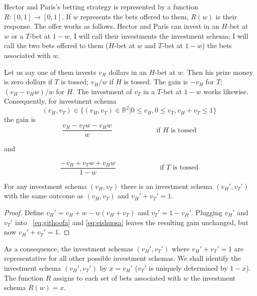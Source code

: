 \documentclass[12pt]{article}
\begin{document}
Hector and Paris's betting strategy is represented by a function
$R:[0,1]\rightarrow[0,1]$. If $w$ represents the bets offered to them,
$R(w)$ is their response. The offer works as follows. Hector and Paris
can invest in an $H$-bet at $w$ or a $T$-bet at $1-w$. I will call
their investments the investment schema; I will call the two bets offered
to them ($H$-bet at $w$ and $T$-bet at $1-w$) the bets associated with
$w$.

Let us say one of them invests $v_{H}$ dollars in an $H$-bet at $w$.
Then his prize money is zero dollars if $T$ is tossed; $v_{H}/w$ if $H$ is
tossed. The gain is $-v_{H}$ for $T$; $(v_{H}-v_{H}w)/w$ for $H$. The
investment of $v_{T}$ in a $T$-bet at $1-w$ works likewise.
Consequently, for investment schema
\begin{equation}
  \label{eq:fogohthe}
(v_{H},v_{T})\in\{(v_{H},v_{T})\in\mathbb{R}^{2}|0\leq{}v_{H},0\leq{}v_{T},v_{H}+v_{T}\leq{}1\}
\end{equation}
the gain is
\begin{equation}
  \label{eq:githoofa}
  \frac{v_{H}-v_{T}w-v_{H}w}{w}\hspace{1in}\mbox{ if }H\mbox{ is tossed}
\end{equation}

and

\begin{equation}
  \label{eq:eishuosa}
  \frac{-v_{H}+v_{T}w+v_{H}w}{1-w}\hspace{1in}\mbox{ if }T\mbox{ is tossed}
\end{equation}

\begin{proposition}
  \label{prp:ahjahfan}
  For any investment schema $(v_{H},v_{T})$ there is an investment
  schema $(v_{H}',v_{T}')$ with the same outcome as $(v_{H},v_{T})$ and
  $v_{H}'+v_{T}'=1$.
\end{proposition}

\begin{proof}
  \label{prf:xaethaef}
  Define $v_{H}'=v_{H}+w-w(v_{H}+v_{T})$ and
  $v_{T}'=1-v_{H}'$. Plugging $v_{H}'$ and $v_{T}'$ into
  {\quations}~\ref{eq:githoofa} and \ref{eq:eishuosa} leaves the
  resulting gain unchanged, but now $v_{H}'+v_{T}'=1$. 
\end{proof}

As a consequence, the investment schemas $(v_{H}',v_{T}')$ where
$v_{H}'+v_{T}'=1$ are representative for all other possible investment
schemas. We shall identify the investment schema $(v_{H}',v_{T}')$ by
$x=v_{H}'$ ($v_{T}'$ is uniquely determined by $1-x$). The function
$R$ assigns to each set of bets associated with $w$ the investment
schema $R(w)=x$.
\end{document}
